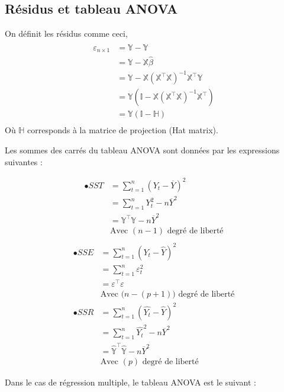 \documentclass[11pt,french]{report}
\begin{document}
\subsection{Résidus et tableau ANOVA}
On définit les résidus comme ceci,
\begin{align*}
\varepsilon_{n \times 1} &= \mathbb{Y} - \hat{\mathbb{Y}} \\
&= \mathbb{Y} - \mathbb{X} \hat{\beta} \\
&= \mathbb{Y} - \mathbb{X}(\mathbb{X}^\intercal\mathbb{X})^{-1}\mathbb{X}^\intercal\mathbb{Y} \\
&= \mathbb{Y} (\mathbb{I} - \mathbb{X}(\mathbb{X}^\intercal\mathbb{X})^{-1}\mathbb{X}^\intercal) \\
&= \mathbb{Y} (\mathbb{I} - \mathbb{H}) \\
\end{align*}
Où $\mathbb{H}$ corresponds à la matrice de projection (Hat matrix).\newline

Les sommes des carrés du tableau ANOVA sont données par les expressions suivantes :

\begin{align*}
\bullet SST &= \displaystyle\sum_{t=1}^n(Y_t - \overline{Y})^2 \\
&= \displaystyle\sum_{t=1}^nY_t^2 - n\overline{Y}^2 \\
&= \mathbb{Y}^\intercal\mathbb{Y} - n \overline{Y}^2 \\
& \text{Avec $(n-1)$ degré de liberté} \\
\end{align*}
\begin{align*}
\bullet SSE &= \displaystyle\sum_{t=1}^n(Y_t - \hat{Y})^2 \\
&= \displaystyle\sum_{t=1}^n\varepsilon_t^2 \\
&= \mathbb{\varepsilon}^\intercal\mathbb{\varepsilon}\\
& \text{Avec $\big(n-(p+1)\big)$ degré de liberté} \\
\bullet SSR &= \displaystyle\sum_{t=1}^n(\hat{Y_t} - \hat{Y})^2 \\
&= \displaystyle\sum_{t=1}^n\hat{Y_t}^2 - n\overline{Y}^2 \\
&= \mathbb{\hat{Y}}^\intercal\mathbb{\hat{Y}} - n \overline{Y}^2\\
& \text{Avec $(p)$ degré de liberté}
\end{align*}

\bigskip
Dans le cas de régression multiple, le tableau ANOVA est le suivant :
\end{document}
